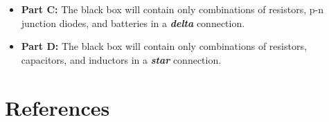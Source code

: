 \begin{refsection}
\begin{itemize}
    \item \textbf{Part C:} The black box will contain only combinations of resistors, p-n junction diodes, and batteries in a \textit{\textbf{delta}} connection. 
    
    \item \textbf{Part D:} The black box will contain only combinations of  resistors, capacitors, and inductors in a \textit{\textbf{star}} connection.
\end{itemize}




\section*{References}






\nocite{khaparde_training_2008}
\nocite{noauthor_pn_2013}
\nocite{noauthor_relationship_2013}
\nocite{noauthor_star_2013}
\nocite{noauthor_beginners_2013}
\nocite{noauthor_rc_2013}
\nocite{noauthor_electronic_2014}
\printbibliography[heading=none]


\newpage
\end{refsection}